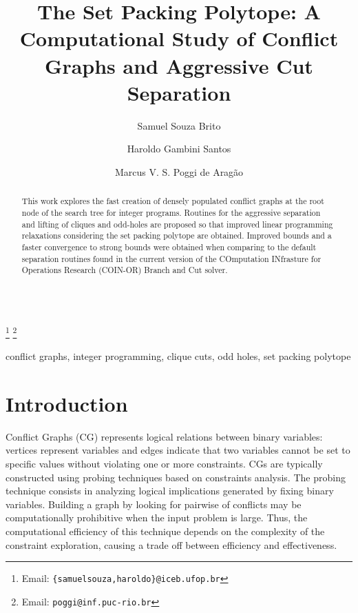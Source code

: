 \documentclass{endm}
\begin{document}
  

\begin{verbatim}\end{verbatim}\vspace{2.5cm}

\begin{frontmatter}

\title{The Set Packing Polytope: A Computational Study of Conflict Graphs and Aggressive Cut Separation}
\author{Samuel Souza Brito \and Haroldo Gambini Santos}
\address{{\small Departamento de Computação, Universidade Federal de Ouro Preto - UFOP\\ Ouro Preto, Brazil}}
\author{Marcus V. S. Poggi de Aragão}
\address{{\small Dep. de Informática, Pontifícia Universidade Católica do Rio de Janeiro - PUC-RIO\\ Rio de Janeiro, Brazil}}
\thanks[mailSamuelHaroldo]{Email: {\texttt{\normalshape \{samuelsouza,haroldo\}@iceb.ufop.br}}} 
\thanks[mailPoggi]{Email: {\texttt{\normalshape poggi@inf.puc-rio.br}}}  

\begin{abstract}
This work explores the fast creation of densely populated conflict graphs at the root node of the search tree for integer programs. Routines for the aggressive separation and lifting of cliques and odd-holes are proposed so that improved linear programming relaxations considering the set packing polytope are obtained. Improved bounds and a faster convergence to strong bounds were obtained when comparing to the default separation routines found in the current version of the COmputation INfrasture for Operations Research (COIN-OR) Branch and Cut solver.
\end{abstract}

\begin{keyword}
conflict graphs, integer programming, clique cuts, odd holes, set packing polytope
\end{keyword}

\end{frontmatter}


\section{Introduction}\label{intro}

Conflict Graphs (CG) represents logical relations between binary variables: vertices represent variables and edges indicate that two variables cannot be set to specific values without violating one or more constraints. CGs are typically constructed using probing techniques \cite{Borndorfer1998} based on constraints analysis. The probing technique consists in analyzing logical implications generated by fixing binary variables.  Building a graph by looking for pairwise of conflicts may be computationally prohibitive when the input problem is large. Thus, the computational efficiency of this technique depends on the complexity of the constraint exploration, causing a trade off between efficiency and effectiveness. 
\end{document}
